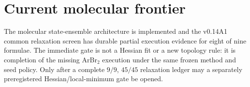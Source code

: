 \section{Current molecular frontier}
The molecular state-ensemble architecture is implemented and the v0.14A1 common relaxation screen has durable partial execution evidence for eight of nine formulae.  The immediate gate is not a Hessian fit or a new topology rule: it is completion of the missing ArBr$_2$ execution under the same frozen method and seed policy.  Only after a complete $9/9$, $45/45$ relaxation ledger may a separately preregistered Hessian/local-minimum gate be opened.
